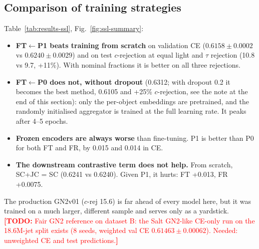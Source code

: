\documentclass[11pt,a4paper]{article}
\newcommand{\todo}[1]{\textcolor{red}{\textbf{[TODO:} #1\textbf{]}}}
\newcommand{\prov}[1]{\textcolor{orange!85!black}{#1}}
\newcommand{\from}[2]{#1$\leftarrow$#2}
\begin{document}
\subsection{Comparison of training strategies}
Table~\ref{tab:results-ssl}, Fig.~\ref{fig:ssl-summary}:
\begin{itemize}
  \item \textbf{\from{FT}{P1} beats training from scratch} on validation CE
        (\prov{$0.6158\pm0.0002$} vs \prov{$0.6240\pm0.0029$}) and on test $c$-rejection at
        equal light and $\tau$ rejection (\prov{10.8 vs 9.7, +11\%}). With nominal fractions
        it is better on all three rejections.
  \item \textbf{\from{FT}{P0} does not, without dropout} (\prov{0.6312}; with dropout 0.2 it
        becomes the best method, \prov{0.6105} and \prov{+25\%} $c$-rejection, see the note at
        the end of this section): only the per-object embeddings are
        pretrained, and the randomly initialised aggregator is trained at the full learning
        rate. It peaks after 4--5 epochs.
  \item \textbf{Frozen encoders are always worse} than fine-tuning. P1 is better than P0
        for both FT and FR, by 0.015 and 0.014 in CE.
  \item \textbf{The downstream contrastive term does not help.} From scratch, SC+JC = SC
        (\prov{0.6241 vs 0.6240}). Given P1, it hurts: FT \prov{+0.013}, FR \prov{+0.0075}.
\end{itemize}
The production GN2v01 (\prov{$c$-rej 15.6}) is far ahead of every model here, but it was
trained on a much larger, different sample and serves only as a yardstick.
\todo{Fair GN2 reference on dataset B: the Salt GN2-like CE-only run on the 18.6M-jet split
exists (8 seeds, weighted val CE $0.61463\pm0.00062$). Needed: unweighted CE and test
predictions.}
\end{document}
